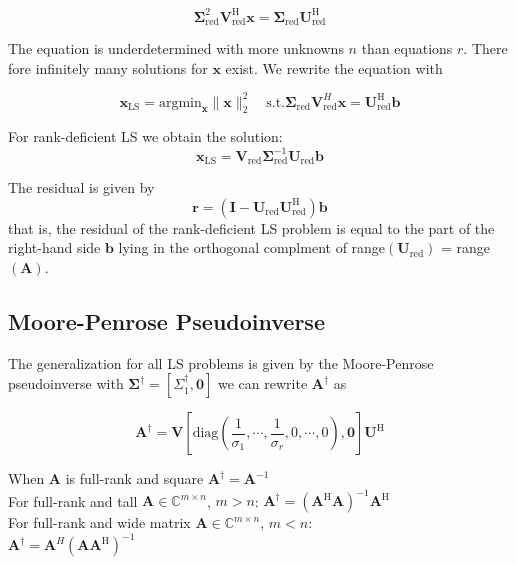 \documentclass[english]{latex4ei/latex4ei_sheet}
\begin{document}
\begin{sectionbox}
$$\mathbf{\Sigma}^2_{\text{red}}\mathbf{V}^\text{H}_{\text{red}}\mathbf{x} = \mathbf{\Sigma}_{\text{red}}\mathbf{U}^\text{H}_{\text{red}}$$

The equation is underdetermined with more unknowns $n$ than equations $r$. There fore infinitely many solutions for $\mathbf{x}$ exist. We rewrite the equation with

$$\mathbf{x}_{\text{LS}} =\text{argmin}_\mathbf{x} \parallel \mathbf{x}\parallel^2_2 \quad \text{s.t.} \mathbf{\Sigma}_{\text{red}}\mathbf{V}^H_{\text{red}}\mathbf{x} = \mathbf{U}^\text{H}_{\text{red}}\mathbf{b}$$

For rank-deficient LS we obtain the solution:
$$\mathbf{x}_{\text{LS}}=\mathbf{V}_{\text{red}}\mathbf{\Sigma}^{-1}_{\text{red}}\mathbf{U}_{\text{red}}\mathbf{b}$$

The residual is given by $$\mathbf{r} = (\mathbf{I} - \mathbf{U}_{\text{red}}\mathbf{U}_{\text{red}}^\text{H})\mathbf{b}$$
that is, the residual of the rank-deficient LS problem is equal to the part of the right-hand side $\mathbf{b}$ lying in the orthogonal complment of range$(\mathbf{U}_{\text{red}})$ = range$(\mathbf{A})$.
\end{sectionbox}
\begin{sectionbox}
\subsection{Moore-Penrose Pseudoinverse}
The generalization for all LS problems is given by the Moore-Penrose pseudoinverse with $\mathbf{\Sigma}^\dagger = [\Sigma^\dagger_1, \mathbf{0}]$ we can rewrite $\mathbf{A}^\dagger$ as

$$\mathbf{A}^\dagger = \mathbf{V}[\text{diag}(\frac{1}{\sigma_1}, \cdots, \frac{1}{\sigma_r}, 0, \cdots,0),\mathbf{0}]\mathbf{U}^\text{H}$$

When $\mathbf{A}$ is full-rank and square $\mathbf{A}^\dagger = \mathbf{A}^{-1}$\\
For full-rank and tall $\mathbf{A}\in\mathbb{C}^{m\times n}$, $m > n$: $\mathbf{A}^\dagger = (\mathbf{A}^\text{H}\mathbf{A})^{-1}\mathbf{A}^\text{H}$\\
For full-rank and wide matrix $\mathbf{A} \in\mathbb{C}^{m\times n}$, $m < n$:\\
$\mathbf{A}^\dagger = \mathbf{A}^H(\mathbf{A}\mathbf{A}^\text{H})^{-1}$
\end{sectionbox}
\end{document}
